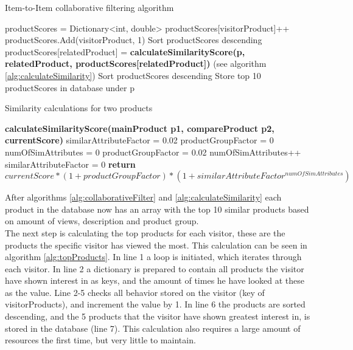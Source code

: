 \begin{algorithm}[H]
\caption{Item-to-Item collaborative filtering algorithm}
\label{alg:collaborativeFilter}
\begin{algorithmic}[1]
\State productScores = Dictionary<int, double>
\State productScores[visitorProduct]++
\Else
\State productScores.Add(visitorProduct, 1)
\EndIf
\EndFor
\EndFor
\State Sort productScores descending
\State productScores[relatedProduct] =
\State \textbf{calculateSimilarityScore(p, relatedProduct, productScores[relatedProduct])} (see algorithm \ref{alg:calculateSimilarity})
\EndFor
\State Sort productScores descending
\State Store top 10 productScores in database under p
\EndFor
\end{algorithmic}
\end{algorithm}

\begin{algorithm}[H]
\caption{Similarity calculations for two products }
\label{alg:calculateSimilarity}
\begin{algorithmic}[1]

\State \textbf{calculateSimilarityScore(mainProduct p1, compareProduct p2, currentScore)}
\State similarAttributeFactor = 0.02
\State productGroupFactor = 0
\State numOfSimAttributes = 0
\State productGroupFactor = 0.02
\EndIf
{}
\State numOfSimAttributes++
\EndIf
\EndFor
{}
\State similarAttributeFactor = 0
\EndIf
\State \textbf{return} \begin{math} currentScore * (1+productGroupFactor)*(1+similarAttributeFactor^{numOfSimAttributes}) \end{math}
\end{algorithmic}
\end{algorithm}


After algorithms \ref{alg:collaborativeFilter} and \ref{alg:calculateSimilarity} each product in the database now has an array with the top 10 similar products based on amount of views, description and product group. \\
The next step is calculating the top products for each visitor, these are the products the specific visitor has viewed the most. This calculation can be seen in algorithm \ref{alg:topProducts}. In line 1 a loop is initiated, which iterates through each visitor. In line 2 a dictionary is prepared to contain all products the visitor have shown interest in as keys, and the amount of times he have looked at these as the value. Line 2-5 checks all behavior stored on the visitor (key of visitorProducts), and increment the value by 1. In line 6 the products are sorted descending, and the 5 products that the visitor have shown greatest interest in, is stored in the database (line 7). This calculation also requires a large amount of resources the first time, but very little to maintain.

